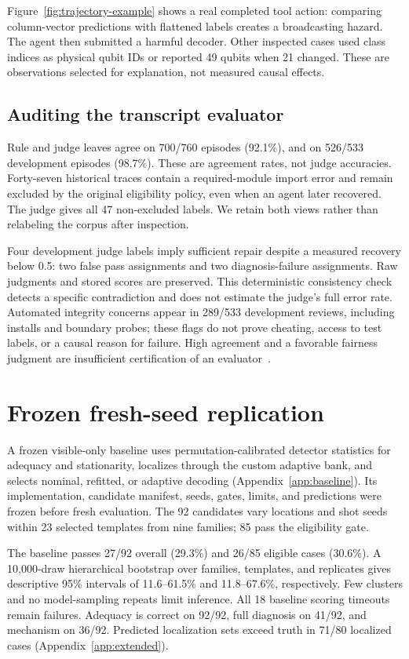 \documentclass{article}
\begin{document}
Figure~\ref{fig:trajectory-example} shows a real completed tool action: comparing column-vector predictions with flattened labels creates a broadcasting hazard. The agent then submitted a harmful decoder. Other inspected cases used class indices as physical qubit IDs or reported 49 qubits when 21 changed. These are observations selected for explanation, not measured causal effects.

\subsection{Auditing the transcript evaluator}
Rule and judge leaves agree on 700/760 episodes (92.1\%), and on 526/533 development episodes (98.7\%). These are agreement rates, not judge accuracies. Forty-seven historical traces contain a required-module import error and remain excluded by the original eligibility policy, even when an agent later recovered. The judge gives all 47 non-excluded labels. We retain both views rather than relabeling the corpus after inspection.

Four development judge labels imply sufficient repair despite a measured recovery below 0.5: two false pass assignments and two diagnosis-failure assignments. Raw judgments and stored scores are preserved. This deterministic consistency check detects a specific contradiction and does not estimate the judge's full error rate. Automated integrity concerns appear in 289/533 development reviews, including installs and boundary probes; these flags do not prove cheating, access to test labels, or a causal reason for failure. High agreement and a favorable fairness judgment are insufficient certification of an evaluator~\citep{judge,quantumaudit}.

\section{Frozen fresh-seed replication}
A frozen visible-only baseline uses permutation-calibrated detector statistics for adequacy and stationarity, localizes through the custom adaptive bank, and selects nominal, refitted, or adaptive decoding (Appendix~\ref{app:baseline}). Its implementation, candidate manifest, seeds, gates, limits, and predictions were frozen before fresh evaluation. The 92 candidates vary locations and shot seeds within 23 selected templates from nine families; 85 pass the eligibility gate.

The baseline passes 27/92 overall (29.3\%) and 26/85 eligible cases (30.6\%). A 10,000-draw hierarchical bootstrap over families, templates, and replicates gives descriptive 95\% intervals of 11.6--61.5\% and 11.8--67.6\%, respectively. Few clusters and no model-sampling repeats limit inference. All 18 baseline scoring timeouts remain failures. Adequacy is correct on 92/92, full diagnosis on 41/92, and mechanism on 36/92. Predicted localization sets exceed truth in 71/80 localized cases (Appendix~\ref{app:extended}).
\end{document}
